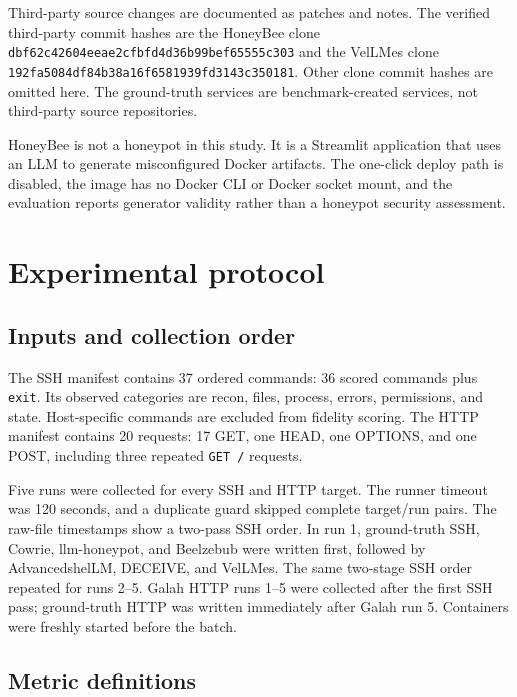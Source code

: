 \documentclass[a4paper,11pt]{article}
\begin{document}
Third-party source changes are documented as patches and notes. The verified
third-party commit hashes are the HoneyBee clone
\texttt{dbf62c42604eeae2cfbfd4d36b99bef65555c303} and the VelLMes clone
\texttt{192fa5084df84b38a16f6581939fd3143c350181}. Other clone commit hashes
are omitted here. The ground-truth services are benchmark-created services,
not third-party source repositories.

HoneyBee is not a honeypot in this study. It is a Streamlit application that
uses an LLM to generate misconfigured Docker artifacts. The one-click deploy
path is disabled, the image has no Docker CLI or Docker socket mount, and the
evaluation reports generator validity rather than a honeypot security
assessment.

\section{Experimental protocol}

\subsection{Inputs and collection order}

The SSH manifest contains 37 ordered commands: 36 scored commands plus
\texttt{exit}. Its observed categories are recon, files, process, errors,
permissions, and state. Host-specific commands are excluded from fidelity
scoring. The HTTP manifest contains 20 requests: 17 GET, one HEAD, one
OPTIONS, and one POST, including three repeated \texttt{GET /} requests.

Five runs were collected for every SSH and HTTP target. The runner timeout was
120 seconds, and a duplicate guard skipped complete target/run pairs. The
raw-file timestamps show a two-pass SSH order. In run 1, ground-truth SSH,
Cowrie, llm-honeypot, and Beelzebub were written first, followed by
AdvancedshelLM, DECEIVE, and VelLMes. The same two-stage SSH order repeated
for runs 2--5. Galah HTTP runs 1--5 were collected after the first SSH pass;
ground-truth HTTP was written immediately after Galah run 5. Containers were
freshly started before the batch.

\subsection{Metric definitions}
\end{document}

